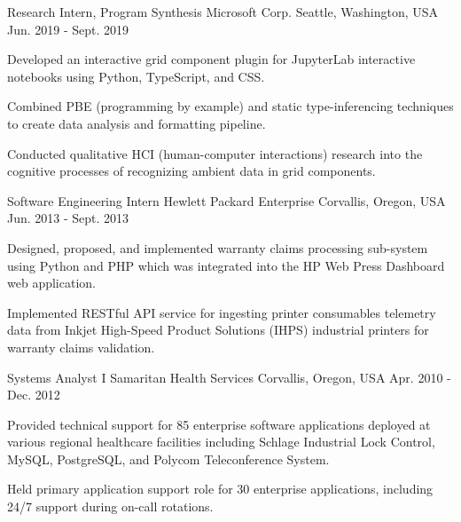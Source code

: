 \begin{cventries}
  \cventry
    {Research Intern, Program Synthesis} %
    {Microsoft Corp.} %
    {Seattle, Washington, USA} %
    {Jun. 2019 - Sept. 2019} %
    {
      \begin{cvitems} %
        \item {Developed an interactive grid component plugin for JupyterLab interactive notebooks using Python, TypeScript, and CSS.}
        \item {Combined PBE (programming by example) and static type-inferencing techniques to create data analysis and formatting pipeline.}
        \item {Conducted qualitative HCI (human-computer interactions) research into the cognitive processes of recognizing ambient data in grid components.}
      \end{cvitems}
    }

  \cventry
    {Software Engineering Intern} %
    {Hewlett Packard Enterprise} %
    {Corvallis, Oregon, USA} %
    {Jun. 2013 - Sept. 2013} %
    {
      \begin{cvitems} %
        \item {Designed, proposed, and implemented warranty claims processing sub-system using Python and PHP which was integrated into the HP Web Press Dashboard web application.}
        \item {Implemented RESTful API service for ingesting printer consumables telemetry data from Inkjet High-Speed Product Solutions (IHPS) industrial printers for warranty claims validation.}
      \end{cvitems}
    }

  \cventry
    {Systems Analyst I} %
    {Samaritan Health Services} %
    {Corvallis, Oregon, USA} %
    {Apr. 2010 - Dec. 2012} %
    {
      \begin{cvitems} %
        \item {Provided technical support for 85 enterprise software applications deployed at various regional healthcare facilities including Schlage Industrial Lock Control, MySQL, PostgreSQL, and Polycom Teleconference System.}
        \item {Held primary application support role for 30 enterprise applications, including 24/7 support during on-call rotations.}
      \end{cvitems}
    }


\end{cventries}
